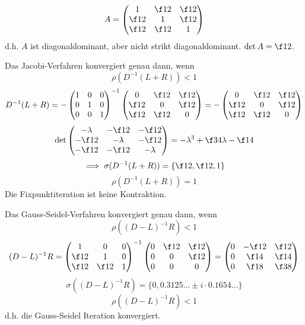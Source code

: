 \documentclass[a4paper]{scrartcl}
\numberwithin{equation}{section}
\begin{document}
\begin{ex}
	\[
		A = \begin{pmatrix} 1 & \f12 & \f 12 \\ \f 12 & 1 & \f12\\ \f12 & \f12 & 1\end{pmatrix}
	\]
	d.h. $A$ ist diagonaldominant, aber nicht strikt diagonaldominant.
	$\det A = \f 12$.

	Das Jacobi-Verfahren konvergiert genau dann, wenn
	\[
		\rho(D^{-1}(L+R)) < 1
	\]
	\[
		D^{-1}(L+R) = -\begin{pmatrix}1&0&0\\0&1&0\\0&0&1\end{pmatrix}^{-1}\begin{pmatrix}0&\f12&\f12 \\ \f12 & 0 & \f12 \\ \f12 & \f12 & 0\end{pmatrix} = - \begin{pmatrix}0& \f12 & \f 12 \\ \f12 & 0 & \f 12 \\ \f 12  & \f12 & 0\end{pmatrix}
	\]
	\[
		\det\begin{pmatrix}-\lambda & -\f12 & -\f12 \\ -\f 12 & -\lambda & -\f 12 \\ -\f 12 & -\f12 & -\lambda\end{pmatrix} = -\lambda^3 + \f34 \lambda - \f 14
	\]
	\[
		\implies \sigma(D^{-1}(L+R)) = \{\f 12, \f 12, 1\}
	\]
	\[
		\rho (D^{-1}(L+R)) = 1
	\]
	Die Fixpunktiteration ist keine Kontraktion.

	Das Gauss-Seidel-Verfahren konvergiert genau dann, wenn
	\[
		\rho((D-L)^{-1}R) < 1
	\]
	\[
	(D-L)^{-1}R = \begin{pmatrix}1&0&0\\ \f12 & 1 & 0\\ \f12 & \f12 & 1\end{pmatrix}^{-1} \begin{pmatrix}0&\f12& \f12\\0&0&\f12\\0&0&0\end{pmatrix} = \begin{pmatrix}0& -\f12 & \f12\\0&\f14 & \f14\\0&\f18& \f38\end{pmatrix}
	\]
	\[
		\sigma((D-L)^{-1}R) = \{0,0.3125\dots \pm i\cdot 0.1654\dots\}
	\]
	\[
		\rho((D-L)^{-1}R) < 1
	\]
	d.h. die Gauss-Seidel Iteration konvergiert.

\end{ex}
\end{document}
